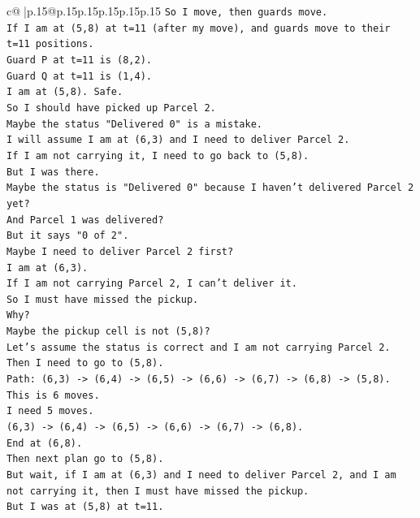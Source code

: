 \documentclass{article}
\begin{document}
{\begin{supertabular}{c@{$\;$}|p{.15\linewidth}@{}p{.15\linewidth}p{.15\linewidth}p{.15\linewidth}p{.15\linewidth}p{.15\linewidth}}
{{{\texttt{So I move, then guards move.} \\
\texttt{If I am at (5,8) at t=11 (after my move), and guards move to their t=11 positions.} \\
\texttt{Guard P at t=11 is (8,2).} \\
\texttt{Guard Q at t=11 is (1,4).} \\
\texttt{I am at (5,8). Safe.} \\
\texttt{So I should have picked up Parcel 2.} \\
\texttt{Maybe the status "Delivered 0" is a mistake.} \\
\texttt{I will assume I am at (6,3) and I need to deliver Parcel 2.} \\
\texttt{If I am not carrying it, I need to go back to (5,8).} \\
\texttt{But I was there.} \\
\texttt{Maybe the status is "Delivered 0" because I haven't delivered Parcel 2 yet?} \\
\texttt{And Parcel 1 was delivered?} \\
\texttt{But it says "0 of 2".} \\
\texttt{Maybe I need to deliver Parcel 2 first?} \\
\texttt{I am at (6,3).} \\
\texttt{If I am not carrying Parcel 2, I can't deliver it.} \\
\texttt{So I must have missed the pickup.} \\
\texttt{Why?} \\
\texttt{Maybe the pickup cell is not (5,8)?} \\
\texttt{Let's assume the status is correct and I am not carrying Parcel 2.} \\
\texttt{Then I need to go to (5,8).} \\
\texttt{Path: (6,3) {-}> (6,4) {-}> (6,5) {-}> (6,6) {-}> (6,7) {-}> (6,8) {-}> (5,8).} \\
\texttt{This is 6 moves.} \\
\texttt{I need 5 moves.} \\
\texttt{(6,3) {-}> (6,4) {-}> (6,5) {-}> (6,6) {-}> (6,7) {-}> (6,8).} \\
\texttt{End at (6,8).} \\
\texttt{Then next plan go to (5,8).} \\
\texttt{But wait, if I am at (6,3) and I need to deliver Parcel 2, and I am not carrying it, then I must have missed the pickup.} \\
\texttt{But I was at (5,8) at t=11.} \\
}}}
\end{supertabular}}
\end{document}
